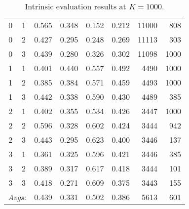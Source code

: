 \begin{table}[!ht]
{\begin{tabular}{cc|ccccrr}
0 & 1 & 0.565 & 0.348 & 0.152 & 0.212 & 11000 & 808 \\%
0 & 2 & 0.427 & 0.295 & 0.248 & 0.269 & 11113 & 303 \\%
0 & 3 & 0.439 & 0.280 & 0.326 & 0.302 & 11098 & 1000 \\ \hline %
1 & 1 & 0.401 & 0.440 & 0.557 & 0.492 & 4490 & 1000 \\%
1 & 2 & 0.385 & 0.384 & 0.571 & 0.459 & 4493 & 1000 \\%
1 & 3 & 0.442 & 0.338 & 0.590 & 0.430 & 4489 & 385 \\ \hline %
2 & 1 & 0.402 & 0.355 & 0.534 & 0.426 & 3447 & 1000 \\%
2 & 2 & 0.596 & 0.328 & 0.602 & 0.424 & 3444 & 942 \\%
2 & 3 & 0.443 & 0.295 & 0.623 & 0.400 & 3446 & 137 \\ \hline %
3 & 1 & 0.361 & 0.325 & 0.596 & 0.421 & 3446 & 385 \\
3 & 2 & 0.389 & 0.317 & 0.617 & 0.418 & 3444 & 101 \\%
3 & 3 & 0.418 & 0.271 & 0.609 & 0.375 & 3443 & 155 \\ \hline %
 \multicolumn{2}{r|}{\textit{Avgs:}} & 0.439 & 0.331 & 0.502 & 0.386 & 5613 & 601 \\
 \bottomrule
\end{tabular}
\label{subtab:intr-O-1000}
}
\caption{Intrinsic evaluation results at $K = 1000$. 
}
\label{tab:intr-1000}
\end{table}

